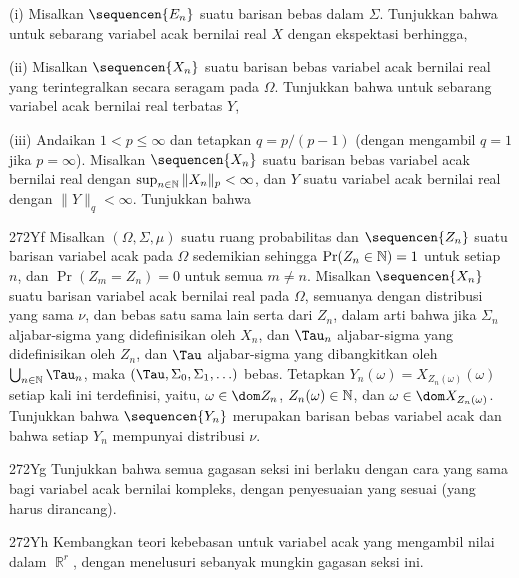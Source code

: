 {\quad (i) Misalkan $\sequencen{E_n}$ suatu barisan bebas dalam
$\Sigma$. Tunjukkan bahwa untuk sebarang variabel acak bernilai real $X$
dengan ekspektasi berhingga,


\noindent {}

\quad (ii) Misalkan $\sequencen{X_n}$ suatu barisan bebas variabel
acak bernilai real yang terintegralkan secara seragam pada $\Omega$.
Tunjukkan bahwa untuk sebarang variabel acak bernilai real terbatas $Y$,


\quad(iii) Andaikan $1<p\le\infty$ dan tetapkan $q=p/(p-1)$ (dengan
mengambil $q=1$ jika $p=\infty$). Misalkan $\sequencen{X_n}$ suatu
barisan bebas variabel acak bernilai real dengan
$\sup_{n\in\Bbb N}\|X_n\|_p<\infty$, dan $Y$ suatu variabel acak bernilai
real dengan $\|Y\|_q<\infty$. Tunjukkan bahwa


\spheader 272Yf
Misalkan $(\Omega,\Sigma,\mu)$ suatu ruang probabilitas dan
$\sequencen{Z_n}$ suatu barisan variabel acak pada $\Omega$ sedemikian
sehingga $\Pr(Z_n\in\Bbb N)=1$ untuk setiap $n$, dan
$\Pr(Z_m=Z_n)=0$ untuk semua $m\ne n$. Misalkan $\sequencen{X_n}$ suatu
barisan variabel acak bernilai real pada $\Omega$, semuanya dengan
distribusi yang sama $\nu$, dan bebas satu sama lain serta dari
$Z_n$, dalam arti bahwa jika $\Sigma_n$ aljabar-sigma yang didefinisikan
oleh $X_n$, dan $\Tau_n$ aljabar-sigma yang didefinisikan oleh $Z_n$,
dan $\Tau$ aljabar-sigma yang dibangkitkan oleh
$\bigcup_{n\in\Bbb N}\Tau_n$, maka
$(\Tau,\Sigma_0,\Sigma_1,\ldots)$ bebas. Tetapkan
$Y_n(\omega)=X_{Z_n(\omega)}(\omega)$ setiap kali ini terdefinisi, yaitu,
$\omega\in\dom Z_n$, $Z_n(\omega)\in\Bbb N$, dan
$\omega\in\dom X_{Z_n(\omega)}$. Tunjukkan bahwa $\sequencen{Y_n}$
merupakan barisan bebas variabel acak dan bahwa setiap $Y_n$
mempunyai distribusi $\nu$.

\spheader 272Yg
Tunjukkan bahwa semua gagasan seksi ini berlaku dengan cara yang sama
bagi variabel acak bernilai kompleks, dengan penyesuaian yang sesuai
(yang harus dirancang).

\spheader 272Yh Kembangkan teori kebebasan untuk
variabel acak yang mengambil nilai dalam $\BbbR^r$, dengan menelusuri
sebanyak mungkin gagasan seksi ini.
}%

